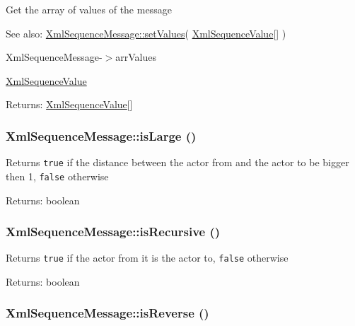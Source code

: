 Get the array of values of the message

\begin{Desc}
\item[See also:]\hyperlink{class_xml_sequence_message_4ed3a9eceec6ce84566098813fde6101}{XmlSequenceMessage::setValues}( \hyperlink{class_xml_sequence_value}{XmlSequenceValue}\mbox{[}\mbox{]} ) 

XmlSequenceMessage-$>$arrValues 

\hyperlink{class_xml_sequence_value}{XmlSequenceValue} \end{Desc}
\begin{Desc}
\item[Returns:]\hyperlink{class_xml_sequence_value}{XmlSequenceValue}\mbox{[}\mbox{]} \end{Desc}
\hypertarget{class_xml_sequence_message_c2fdfe0fd692c08d72faf1ca63fb7263}{
\subsubsection[{isLarge}]{\setlength{\rightskip}{0pt plus 5cm}XmlSequenceMessage::isLarge ()}}
\label{class_xml_sequence_message_c2fdfe0fd692c08d72faf1ca63fb7263}


Returns {\tt true} if the distance between the actor from and the actor to be bigger then 1, {\tt false} otherwise

\begin{Desc}
\item[Returns:]boolean \end{Desc}
\hypertarget{class_xml_sequence_message_50dd7454dfc6418b76613e6518a1fcc1}{
\subsubsection[{isRecursive}]{\setlength{\rightskip}{0pt plus 5cm}XmlSequenceMessage::isRecursive ()}}
\label{class_xml_sequence_message_50dd7454dfc6418b76613e6518a1fcc1}


Returns {\tt true} if the actor from it is the actor to, {\tt false} otherwise

\begin{Desc}
\item[Returns:]boolean \end{Desc}
\hypertarget{class_xml_sequence_message_c73e3d276fb5b60bfac84c7bda29cb1e}{
\subsubsection[{isReverse}]{\setlength{\rightskip}{0pt plus 5cm}XmlSequenceMessage::isReverse ()}}
\label{class_xml_sequence_message_c73e3d276fb5b60bfac84c7bda29cb1e}


